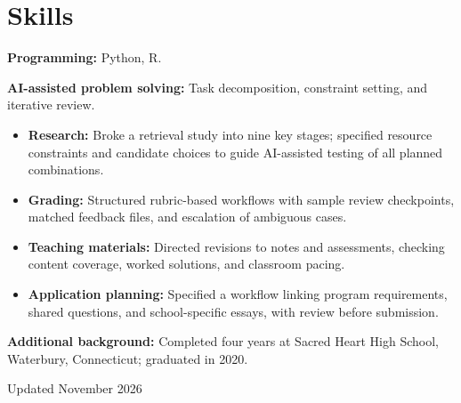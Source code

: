 \documentclass[10pt,letterpaper]{article}
\begin{document}
\section*{Skills}
\textbf{Programming:} Python, R.\par
\textbf{AI-assisted problem solving:} Task decomposition, constraint setting, and iterative review.
\begin{itemize}
\item \textbf{Research:} Broke a retrieval study into nine key stages; specified resource constraints and candidate choices to guide AI-assisted testing of all planned combinations.
\item \textbf{Grading:} Structured rubric-based workflows with sample review checkpoints, matched feedback files, and escalation of ambiguous cases.
\item \textbf{Teaching materials:} Directed revisions to notes and assessments, checking content coverage, worked solutions, and classroom pacing.
\item \textbf{Application planning:} Specified a workflow linking program requirements, shared questions, and school-specific essays, with review before submission.
\end{itemize}
\vspace{4pt}
\textbf{Additional background:} Completed four years at Sacred Heart High School, Waterbury, Connecticut; graduated in 2020.\par
\vspace{2pt}
Updated November 2026
\end{document}
